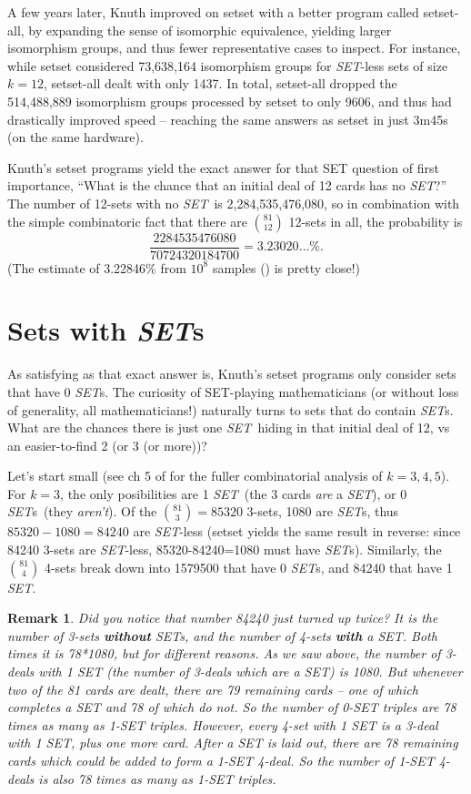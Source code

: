 \documentclass{article}
\newtheorem*{remark}{Remark}
\newcommand{\SET}{{\em SET}}
\newcommand{\SETs}{{\em SET}s}
\newcommand{\SETSETb}{{\sc setset }}
\newcommand{\SETSETA}{{\sc setset-all}}
\newcommand{\SETSETAb}{{\sc setset-all }}
\begin{document}
A few years later, Knuth improved on \SETSETb with a better program called
\SETSETA, by expanding the sense of isomorphic equivalence, yielding larger
isomorphism groups, and thus fewer representative cases to inspect. For
instance, while \SETSETb considered 73,638,164 isomorphism groups for \SET-less
sets of size $k=12$, \SETSETAb dealt with only 1437. In total, \SETSETAb dropped
the 514,488,889 isomorphism groups processed by \SETSETb to only 9606, and thus
had drastically improved speed -- reaching the same answers as \SETSETb in just
3m45s (on the same hardware).

Knuth's \SETSETb programs yield the exact answer for that SET question of first
importance, ``What is the chance that an initial deal of 12 cards has no \SET?''
The number of 12-sets with no \SET~is 2,284,535,476,080, so in combination with
the simple combinatoric fact that there are $\binom{81}{12}$ 12-sets in all, the
probability is
$$\frac{2284535476080}{70724320184700} = 3.23020\ldots\%.$$
(The estimate of 3.22846\% from $10^8$ samples (\cite{JOS}) is pretty close!)

\section{Sets with \SETs}
As satisfying as that exact answer is, Knuth's \SETSETb programs only consider
sets that have 0 \SETs. The curiosity of SET-playing mathematicians (or without
loss of generality, all mathematicians!) naturally turns to sets that do contain
\SETs. What are the chances there is just one \SET~hiding in that initial deal
of 12, vs an easier-to-find 2 (or 3 (or more))?

Let's start small (see ch 5 of \cite{JOS} for the fuller combinatorial analysis of
$k=3,4,5$). For $k=3$, the only posibilities are 1 \SET~(the 3 cards {\em are}
a \SET), or 0 \SETs~(they {\em aren't}). Of the $\binom{81}{3}=85320$ 3-sets,
1080 are \SETs, thus $85320-1080=84240$ are \SET-less (\SETSETb yields
the same result in reverse: since 84240 3-sets are \SET-less, 85320-84240=1080
must have \SETs). Similarly, the $\binom{81}{4}$ 4-sets break down into 1579500
that have 0 \SETs, and 84240 that have 1 \SET.
\begin{remark}Did you notice that number 84240 just turned up twice? It is the
number of 3-sets {\bf without} \SETs, and the number of 4-sets {\bf with} a
\SET. Both times it is 78*1080, but for different reasons. As we saw above, the
number of 3-deals with 1 SET (the number of 3-deals which {\em are} a SET) is
1080. But whenever two of the 81 cards are dealt, there are 79 remaining cards
-- one of which completes a SET and 78 of which do not. So the number of 0-SET
triples are 78 times as many as 1-SET triples. However, every 4-set with 1 SET
is a 3-deal with 1 SET, plus one more card. After a SET is laid out, there are
78 remaining cards which could be added to form a 1-SET 4-deal. So the number of
1-SET 4-deals is also 78 times as many as 1-SET triples.
\end{remark}
\end{document}
